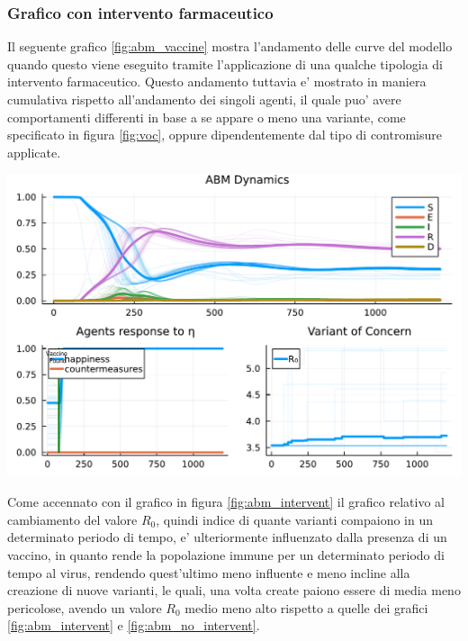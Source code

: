 \subsubsection*{Grafico con intervento farmaceutico}
Il seguente grafico \ref{fig:abm_vaccine} mostra l'andamento delle curve del modello
quando questo viene eseguito tramite l'applicazione di una qualche tipologia di intervento farmaceutico. 
Questo andamento tuttavia e' mostrato in maniera cumulativa rispetto all'andamento dei singoli agenti, 
il quale puo' avere comportamenti differenti in base a se appare o meno una variante, 
come specificato in figura \ref{fig:voc}, oppure dipendentemente dal tipo di contromisure applicate.

\begin{minipage}{\linewidth}
	\centering
	\includegraphics[width=\textwidth]{img/SocialNetworkABM_VACCINE.pdf}
	\label{fig:abm_vaccine}
\end{minipage}

Come accennato con il grafico in figura \ref{fig:abm_intervent} il grafico relativo al cambiamento 
del valore $R_0$, quindi indice di quante varianti compaiono in un determinato periodo di tempo, e' 
ulteriormente influenzato dalla presenza di un vaccino, in quanto rende la popolazione immune per
un determinato periodo di tempo al virus, rendendo quest'ultimo meno influente e meno incline alla
creazione di nuove varianti, le quali, una volta create paiono essere di media meno pericolose, avendo un 
valore $R_0$ medio meno alto rispetto a quelle dei grafici \ref{fig:abm_intervent} e \ref{fig:abm_no_intervent}.

